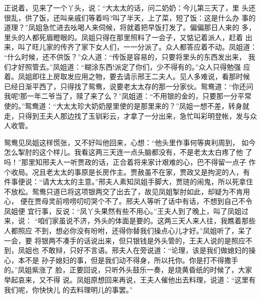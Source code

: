 正说着，见来了一个丫头，说：“大太太的话，问二奶奶：今儿第三天了，里
头还很乱，供了饭，还叫亲戚们等着吗?叫了半天，上了菜，短了饭：这是什么办
事的道理？”凤姐急忙进去吆喝人来伺候，将就着把早饭打发了。偏偏那日人来的
多，里头的人都死眉瞪眼的。凤姐只得在那里照料了一会子，又惦记着派人，赶着
出来，叫了旺儿家的传齐了家下女人们，一一分派了。众人都答应着不动。凤姐道：
“什么时候，还不供饭？”众人道：“传饭是容易的，只要将里头的东西发出来，
我们才好照管去。”凤姐道：“糊涂东西!派定了你们，少不得有的。”众人只得勉强
应着。凤姐即往上房取发应用之物，要去请示邢王二夫人。见人多难说，看那时候
已经日渐平西了，只得找了鸳鸯，说要老太太存的那一分家伙。鸳鸯道：“你还问
我呢!那一年二爷当了，赎了来了么？”凤姐道：“不用银的金的，只要那一分平常
使的。”鸳鸯道：“大太太珍大奶奶屋里使的是那里来的？”凤姐一想不差，转身就
走，只得到王夫人那边找了玉钏彩云，才拿了一分出来，急忙叫彩明登帐，发与众
人收管。

鸳鸯见凤姐这样慌张，又不好叫他回来，心想：“他头里作事何等爽利周到，
如今怎么掣肘的这个样儿。我看这两三天连一点头脑都没有，不是老太太白疼了他
了吗！”那里知邢夫人一听贾政的话，正合着将来家计艰难的心，巴不得留一点子
作个收局。况且老太太的事原是长房作主。贾赦虽不在家，贾政又是拘泥的人，有
件事便说：“请大太太的主意。”邢夫人素知凤姐手脚大，贾琏的闹鬼，所以死拿住
不放松。鸳鸯只道已将这项银两交了出去了，故见凤姐掣肘如此，却疑为不肯用心，
便在贾母灵前唠唠叨叨哭个不了。邢夫人等听了话中有话，不想到自己不令凤姐便
宜行事，反说：“凤丫头果然有些不用心。”王夫人到了晚上，叫了凤姐过来，说：
“咱们家虽说不济，外头的体面是要的。这两三天人来人往，我瞧着那些人都照应
不到，想必你没有吩咐，还得你替我们操点心儿才好。”凤姐听了，呆了一会，要
将银两不凑手的话说出来，但只银钱是外头管的，王夫人说的是照应不到，凤姐也
不敢辩，只好不言语。邢夫人在旁说道：“论理，该是我们做媳妇的操心，本不是
孙子媳妇的事，但是我们动不得身，所以托你。你是打不得撒手的。”凤姐紫涨了
脸，正要回说，只听外头鼓乐一奏，是烧黄昏纸的时候了，大家举起哀来，又不得
说。凤姐原想回来再说，王夫人催他出去料理，说道：“这里有我们呢，你快快儿
的去料理明儿的事罢。”

